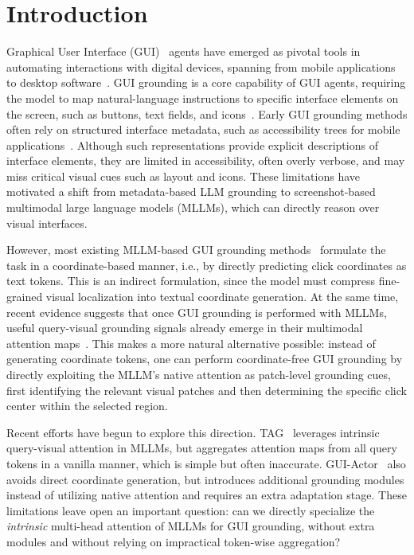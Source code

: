 \section{Introduction}
Graphical User Interface (GUI)~\citep{hong2024cogagent,cheng2024seeclick} agents have emerged as pivotal tools in automating interactions with digital devices, spanning from mobile applications~\citep{rawles2023androidinthewild,rawles2024androidworld,wang2024mobile,ye2025mobile} to desktop software~\citep{zhang2024ufo,qin2025ui,deng2023mind2web,xie2024osworld,cua2025,zheng2024gpt}. 
GUI grounding is a core capability of GUI agents, requiring the model to map natural-language instructions to specific interface elements on the screen, such as buttons, text fields, and icons~\citep{yang2024aria}. Early GUI grounding methods often rely on structured interface metadata, such as accessibility trees for mobile applications~\citep{zhang2025appagent}. Although such representations provide explicit descriptions of interface elements, they are limited in accessibility, often overly verbose, and may miss critical visual cues such as layout and icons.
These limitations have motivated a shift from metadata-based LLM grounding to screenshot-based multimodal large language models (MLLMs), which can directly reason over visual interfaces.

However, most existing MLLM-based GUI grounding methods~\citep{gou2024navigating,wu2024atlas,lin2024showui,xu2024aguvis} formulate the task in a coordinate-based manner, i.e., by directly predicting click coordinates as text tokens. This is an indirect formulation, since the model must compress fine-grained visual localization into textual coordinate generation. 
At the same time, recent evidence suggests that once GUI grounding is performed with MLLMs, useful query-visual grounding signals already emerge in their multimodal attention maps~\citep{xu2024attentiondrivenguigroundingleveraging}. 
This makes a more natural alternative possible: instead of generating coordinate tokens, one can perform coordinate-free GUI grounding by directly exploiting the MLLM's native attention as patch-level grounding cues, first identifying the relevant visual patches and then determining the specific click center within the selected region.

Recent efforts have begun to explore this direction. TAG~\citep{xu2024attentiondrivenguigroundingleveraging} leverages intrinsic query-visual attention in MLLMs, but aggregates attention maps from all query tokens in a vanilla manner, which is simple but often inaccurate. GUI-Actor~\citep{wu2025gui} also avoids direct coordinate generation, but introduces additional grounding modules instead of utilizing native attention and requires an extra adaptation stage. These limitations leave open an important question: can we directly specialize the \emph{intrinsic} multi-head attention of MLLMs for GUI grounding, without extra modules and without relying on impractical token-wise aggregation?

